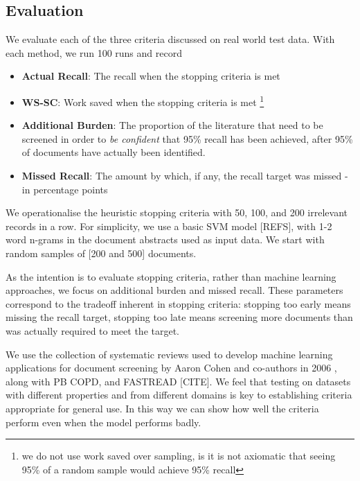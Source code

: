 \documentclass{bmcart}
\begin{document}
	\subsection*{Evaluation}
	
	We evaluate each of the three criteria discussed on real world test data. With each method, we run 100 runs and record 
	\begin{itemize}
		\item \textbf{Actual Recall}: The recall when the stopping criteria is met
		\item \textbf{WS-SC}: Work saved when the stopping criteria is met \footnote{we do not use work saved over sampling, is it is not axiomatic that seeing 95\% of a random sample would achieve 95\% recall}
		\item \textbf{Additional Burden}: The proportion of the literature that need to be screened in order to \textit{be confident} that 95\% recall has been achieved, after 95\% of documents have actually been identified.
		\item \textbf{Missed Recall}: The amount by which, if any, the recall target was missed - in percentage points
	\end{itemize}
	We operationalise the heuristic stopping criteria with 50, 100, and 200 irrelevant records in a row. For simplicity, we use a basic SVM model [REFS], with 1-2 word n-grams in the document abstracts used as input data. We start with random samples of [200 and 500] documents.
	
	As the intention is to evaluate stopping criteria, rather than machine learning approaches, we focus on additional burden and missed recall. These parameters correspond to the tradeoff inherent in stopping criteria: stopping too early means missing the recall target, stopping too late means screening more documents than was actually required to meet the target.
	
	
	
	
	We use the collection of systematic reviews used to develop machine learning applications for document screening by Aaron Cohen and co-authors in 2006 \cite{Cohen2006}, along with PB COPD, and FASTREAD [CITE]. We feel that testing on datasets with different properties and from different domains is key to establishing criteria appropriate for general use. In this way we can show how well the criteria perform even when the model performs badly.
	
\end{document}
